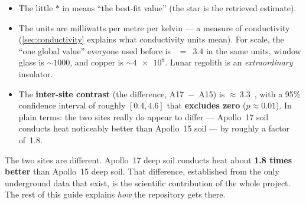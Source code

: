 \begin{itemize}[leftmargin=1.4em,itemsep=3pt]
  \item The little $*$ in \Kdstar{} means ``the best-fit value'' (the star is the
    retrieved estimate).
  \item The units \mwmk{} are milliwatts per metre per kelvin --- a measure of
    conductivity (\autoref{sec:conductivity} explains what conductivity units
    mean). For scale, the ``one global value'' everyone used before is
    \Kd{}~$=$~\num{3.4} in the same units, window glass is ${\sim}1000$, and
    copper is ${\sim}\num{4e8}$. Lunar regolith is an \emph{extraordinary}
    insulator.
  \item The \textbf{inter-site contrast} (the difference, A17~$-$~A15) is
    ${\approx}\,$\num{3.3}~\mwmk{}, with a 95\% confidence interval of roughly
    $[0.4, 4.6]$ that \textbf{excludes zero} ($p \approx 0.01$). In plain terms:
    the two sites really do appear to differ --- Apollo~17 soil conducts heat
    noticeably better than Apollo~15 soil --- by roughly a factor of~1.8.
\end{itemize}

\begin{keyidea}
The two sites are different. Apollo~17 deep soil conducts heat about
\textbf{1.8 times better} than Apollo~15 deep soil. That difference, established
from the only underground data that exist, is the scientific contribution of the
whole project. The rest of this guide explains \emph{how} the repository gets
there.
\end{keyidea}
